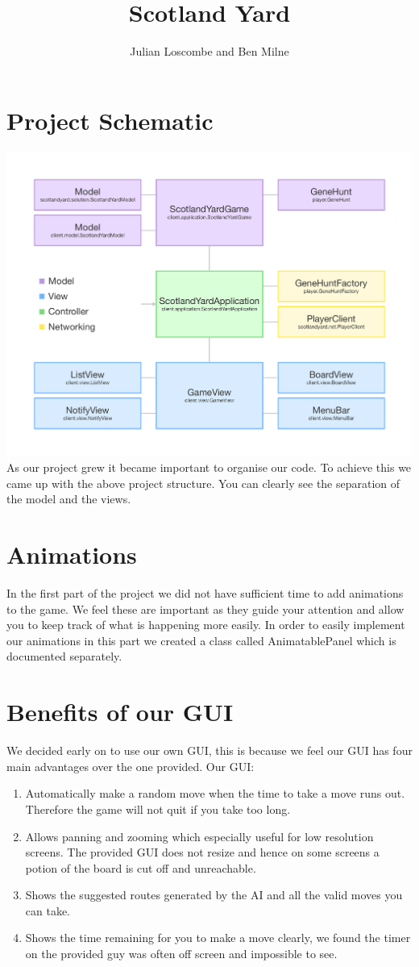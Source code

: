 \documentclass[a4paper, 12pt]{article}
\title{Scotland Yard}
\author{Julian Loscombe and Ben Milne}
\begin{document}
\maketitle
\section{Project Schematic}
\includegraphics[width = 17cm]{mvp_schematic}\\
As our project grew it became important to organise our code. To achieve this we came up with the above project structure. You can clearly see the separation of the model and the views.
\section{Animations}
In the first part of the project we did not have sufficient time to add animations to the game. We feel these are important as they guide your attention and allow you to keep track of what is happening more easily. In order to easily implement our animations in this part we created a class called AnimatablePanel which is documented separately.
\section{Benefits of our GUI}
We decided early on to use our own GUI, this is because we feel our GUI has four main advantages over the one provided. Our GUI:
\begin{enumerate}
	\item Automatically make a random move when the time to take a move runs out. Therefore the game will not quit if you take too long.
	\item Allows panning and zooming which especially useful for low resolution screens. The provided GUI does not resize and hence on some screens a potion of the board is cut off and unreachable.
	\item Shows the suggested routes generated by the AI and all the valid moves you can take.
	\item Shows the time remaining for you to make a move clearly, we found the timer on the provided guy was often off screen and impossible to see.
\end{enumerate}
\end{document}
